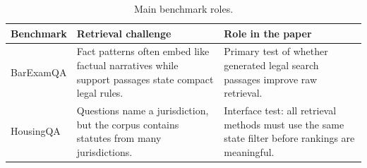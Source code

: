 \begin{table}[t]
\centering
\caption{Main benchmark roles.}
\label{tab:benchmark_role}
\footnotesize
\begin{tabularx}{\columnwidth}{lYY}
\toprule
Benchmark & Retrieval challenge & Role in the paper \\
\midrule
BarExamQA & Fact patterns often embed like factual narratives while support passages state compact legal rules. & Primary test of whether generated legal search passages improve raw retrieval. \\
HousingQA & Questions name a jurisdiction, but the corpus contains statutes from many jurisdictions. & Interface test: all retrieval methods must use the same state filter before rankings are meaningful. \\
\bottomrule
\end{tabularx}
\end{table}

